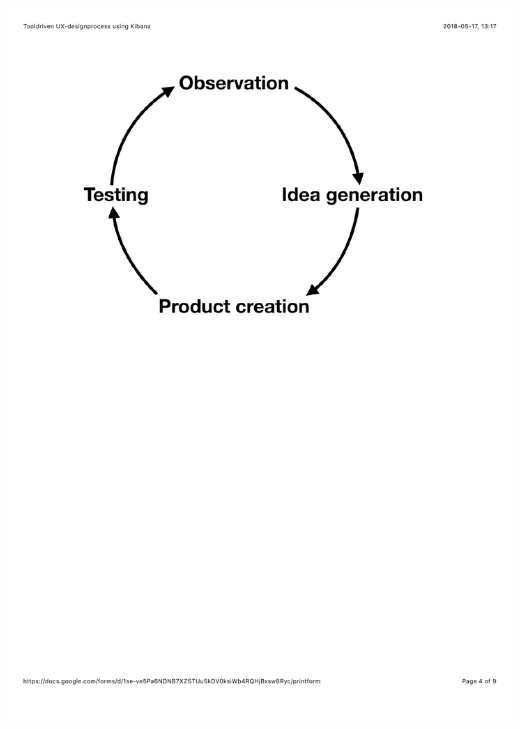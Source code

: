 \documentclass[12pt]{kththesis}
\begin{document}
\begin{appendices}
\includegraphics[width=1\textwidth]{UX_designprocess4.pdf}
\newpage

\end{appendices}
\end{document}
